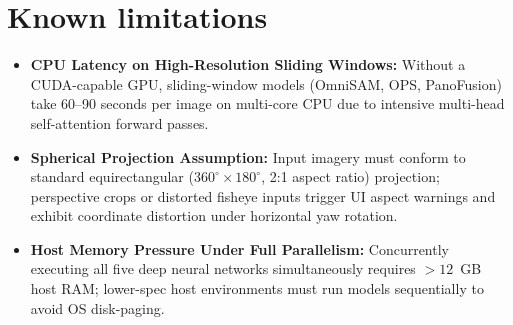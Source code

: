 \documentclass[10pt,a4paper]{article}
\begin{document}
\section{Known limitations}
\begin{itemize}[leftmargin=*,itemsep=1.2pt]
  \item \textbf{CPU Latency on High-Resolution Sliding Windows:} Without a CUDA-capable GPU, sliding-window models (OmniSAM, OPS, PanoFusion) take 60--90 seconds per image on multi-core CPU due to intensive multi-head self-attention forward passes.
  \item \textbf{Spherical Projection Assumption:} Input imagery must conform to standard equirectangular ($360^\circ \times 180^\circ$, 2:1 aspect ratio) projection; perspective crops or distorted fisheye inputs trigger UI aspect warnings and exhibit coordinate distortion under horizontal yaw rotation.
  \item \textbf{Host Memory Pressure Under Full Parallelism:} Concurrently executing all five deep neural networks simultaneously requires $>12$~GB host RAM; lower-spec host environments must run models sequentially to avoid OS disk-paging.
\end{itemize}
\end{document}
